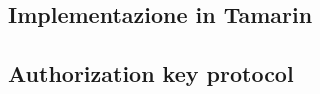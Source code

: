 \begin{appendices}
    \section{Implementazione in Tamarin}
    \subsection{Authorization key protocol}
    
\end{appendices}